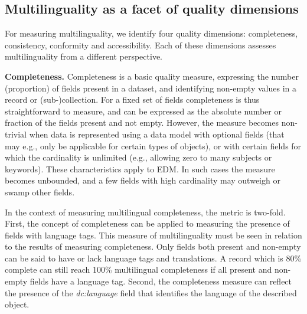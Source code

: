 
\subsection{Multilinguality as a facet of quality dimensions}
For measuring multilinguality, we identify four quality dimensions: completeness, consistency, conformity and accessibility. Each of these dimensions assesses multilinguality from a different perspective. 

\noindent\textbf{Completeness.}
Completeness is a basic quality measure, expressing the number (proportion) of fields present in a dataset, and identifying non-empty values in a record or (sub-)collection. For a fixed set of fields completeness is thus straightforward to measure, and can be expressed as the absolute number or fraction of the fields present and not empty. However, the measure becomes non-trivial when data is represented using a data model with optional fields (that may e.g., only be applicable for certain types of objects), or with certain fields for which the cardinality is unlimited (e.g., allowing zero to many subjects or keywords). These characteristics apply to EDM. In such cases the measure becomes unbounded, and a few fields with high cardinality may outweigh or swamp other fields. 

In the context of measuring multilingual completeness, the metric is two-fold. First, the concept of completeness can be applied to measuring the presence of fields with language tags. This measure of multilinguality must be seen in relation to the results of measuring completeness. Only fields both present and non-empty can be said to have or lack language tags and translations. A record which is 80\% complete can still reach 100\% multilingual completeness if all present and non-empty fields have a language tag.
Second, the completeness measure can reflect the presence of the \textit{dc:language} field that identifies the language of the described object.

